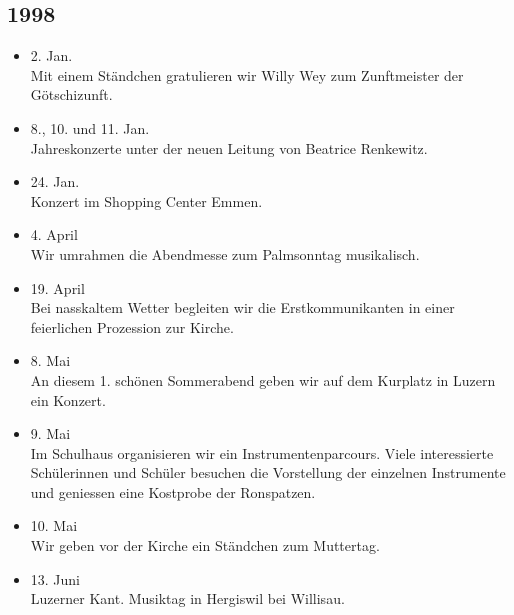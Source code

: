 \subsection{1998}
\begin{history}


    \begin{itemize}

        \item 2. Jan.\\
              Mit einem Ständchen gratulieren wir Willy Wey zum Zunftmeister der
              Götschizunft.

        \item 8., 10. und 11. Jan.\\
              Jahreskonzerte unter der neuen Leitung von Beatrice Renkewitz.

        \item 24. Jan.\\
              Konzert im Shopping Center Emmen.

        \item 4. April\\
              Wir umrahmen die Abendmesse zum Palmsonntag musikalisch.

        \item 19. April\\
              Bei nasskaltem Wetter begleiten wir die Erstkommunikanten in einer
              feierlichen Prozession zur Kirche.

        \item 8. Mai\\
              An diesem 1. schönen Sommerabend geben wir auf dem Kurplatz in Luzern
              ein Konzert.

        \item 9. Mai\\
              Im Schulhaus organisieren wir ein Instrumentenparcours. Viele
              interessierte Schülerinnen und Schüler besuchen die Vorstellung der
              einzelnen Instrumente und geniessen eine Kostprobe der Ronspatzen.

        \item 10. Mai\\
              Wir geben vor der Kirche ein Ständchen zum Muttertag.

        \item 13. Juni\\
              Luzerner Kant. Musiktag in Hergiswil bei Willisau.


\end{itemize}
\end{history}
